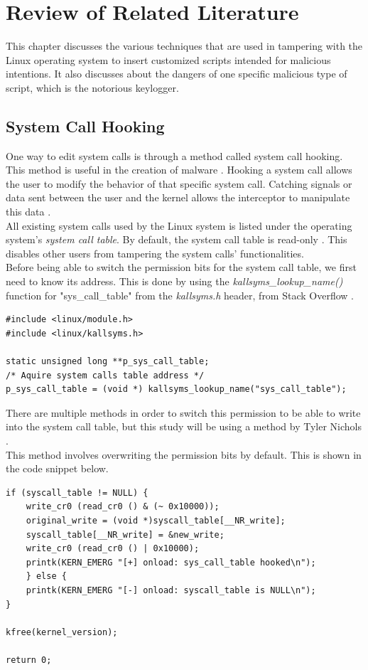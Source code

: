 \documentclass[conference]{IEEEtran}
\newcommand\tab[1][0.5cm]{\hspace*{#1}}
\begin{document}
	\section{Review of Related Literature}
	This chapter discusses the various techniques that are used in tampering with the Linux operating system to insert customized scripts intended for malicious intentions. It also discusses about the dangers of one specific malicious type of script, which is the notorious keylogger.
	\subsection{System Call Hooking}
	One way to edit system calls is through a method called system call hooking. This method is useful in the creation of malware \cite{1}. Hooking a system call allows the user to modify the behavior of that specific system call. Catching signals or data sent between the user and the kernel allows the interceptor to manipulate this data \cite{2}. \\
	\tab All existing system calls used by the Linux system is listed under the operating system's \emph{system call table}. By default, the system call table is read-only \cite{3}. This disables other users from tampering the system calls' functionalities. \\
	\tab Before being able to switch the permission bits for the system call table, we first need to know its address. This is done by using the \emph{kallsyms\_lookup\_name()} function for "sys\_call\_table" from the \emph{kallsyms.h} header, from Stack Overflow \cite{4}.
	\begin{lstlisting}
#include <linux/module.h>
#include <linux/kallsyms.h>

static unsigned long **p_sys_call_table;
/* Aquire system calls table address */
p_sys_call_table = (void *) kallsyms_lookup_name("sys_call_table");
	\end{lstlisting}
	
	There are multiple methods in order to switch this permission to be able to write into the system call table, but this study will be using a method by Tyler Nichols \cite{3}. \\
	\tab This method involves overwriting the permission bits by default. This is shown in the code snippet below.
	
	\begin{lstlisting}
if (syscall_table != NULL) {
	write_cr0 (read_cr0 () & (~ 0x10000));
	original_write = (void *)syscall_table[__NR_write];
	syscall_table[__NR_write] = &new_write;
	write_cr0 (read_cr0 () | 0x10000);
	printk(KERN_EMERG "[+] onload: sys_call_table hooked\n");
	} else {
	printk(KERN_EMERG "[-] onload: syscall_table is NULL\n");
}

kfree(kernel_version);

return 0;
	\end{lstlisting}
	
\end{document}
